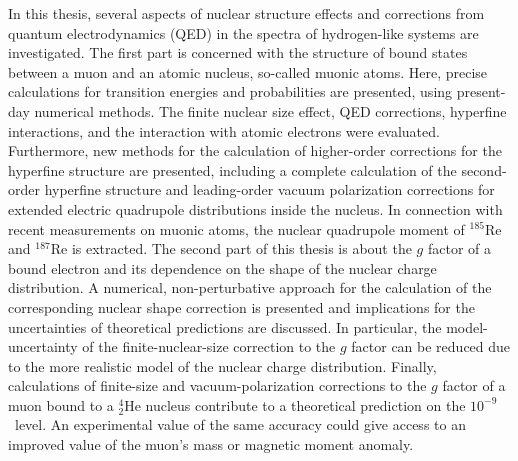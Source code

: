 
{\small
In this thesis, several aspects of nuclear structure effects and corrections from quantum electrodynamics (QED) in the spectra of hydrogen-like systems are investigated. 
The first part is concerned with the structure of bound states between a muon and an atomic nucleus, so-called muonic atoms. Here, precise calculations for transition energies and probabilities are presented, using present-day numerical methods. The finite nuclear size effect, QED corrections, hyperfine interactions, and the interaction with atomic electrons were evaluated. 
Furthermore, new methods for the calculation of higher-order corrections for the hyperfine structure are presented, including a complete calculation of the second-order hyperfine structure and leading-order vacuum polarization corrections for extended electric quadrupole distributions inside the nucleus. 
In connection with recent measurements on muonic atoms, the nuclear quadrupole moment of $^{185}$Re and $^{187}$Re is extracted.
The second part of this thesis is about the $g$ factor of a bound electron and its dependence on the shape of the nuclear charge distribution. 
A numerical, non-perturbative approach for the calculation of the corresponding nuclear shape correction is presented and implications for the uncertainties of theoretical predictions are discussed. In particular, the model-uncertainty of the finite-nuclear-size correction to the $g$ factor can be reduced due to the more realistic model of the nuclear charge distribution.
Finally, calculations of finite-size and vacuum-polarization corrections to the $g$ factor of a muon bound to a $^{4}_2$He nucleus contribute to a theoretical prediction on the $10^{-9}$~level. An experimental value of the same accuracy could give access to an improved value of the muon's mass or magnetic moment anomaly.
}

\thispagestyle{empty}

